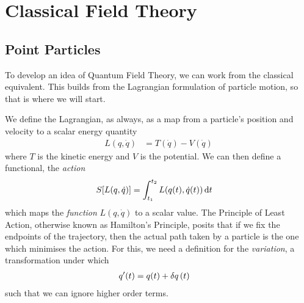 \documentclass[notes.tex]{subfiles}
\begin{document}
\chapter{Classical Field Theory}
\label{chap:rqft_cft}


\section{Point Particles}
\label{sec:rqft_cft_point-particles}
To develop an idea of Quantum Field Theory, we can work from the classical equivalent. 
This builds from the Lagrangian formulation of particle motion, so that is where we will start. 

We define the Lagrangian, as always, as a map from a particle's position and velocity to a scalar energy quantity
\begin{align*}
  L(q, \dot{q}) &= T(\dot{q}) - V(\dot{q})
\end{align*}
where $T$ is the kinetic energy and $V$ is the potential. 
We can then define a functional, the \emph{action} 
\begin{align*}
  S\qty[L(q, \dot{q})] &= \int_{t_1}^{t_2} L\qty(q(t), \dot{q}(t)) \dd{t}
\end{align*}
which maps the \emph{function} $L(q, \dot{q})$ to a scalar value.
The Principle of Least Action, otherwise known as Hamilton's Principle, posits that if we fix the endpoints of the trajectory, then the actual path taken by a particle is the one which minimises the action. 
For this, we need a definition for the \emph{variation}, a transformation under which 
\begin{align*}
  q^\prime(t) &= q(t) + \var{q}(t)
\end{align*}
such that we can ignore higher order terms. 
\end{document}
